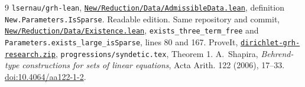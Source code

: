 \documentclass[11pt]{article}
\begin{document}
\begin{thebibliography}{9}
 \texttt{lsernau/grh-lean},
\href{https://github.com/lsernau/grh-lean/blob/72fead102f663d5c7a407964a13dc0cf9d977207/grh/src/New/Reduction/Data/AdmissibleData.lean}{\texttt{New/Reduction/Data/AdmissibleData.lean}},
definition \texttt{New.Parameters.IsSparse}. Readable edition.
 Same repository and commit,
\href{https://github.com/lsernau/grh-lean/blob/72fead102f663d5c7a407964a13dc0cf9d977207/grh/src/New/Reduction/Data/Existence.lean}{\texttt{New/Reduction/Data/Existence.lean}},
\texttt{exists\_three\_term\_free} and \texttt{Parameters.exists\_large\_isSparse},
lines 80 and 167.
 ProveIt, \href{https://github.com/VladimirReshetnikov/ProveIt/blob/d31039a48d963692e5a5176f47b6603fc9e9d9cf/docs/incoming/dirichlet-grh-research.zip}{\texttt{dirichlet-grh-research.zip}}, \texttt{progressions/syndetic.tex}, Theorem 1.
 A.~Shapira, \emph{Behrend-type constructions for sets of
linear equations}, Acta Arith. 122 (2006), 17--33.
\href{https://doi.org/10.4064/aa122-1-2}{doi:10.4064/aa122-1-2}.
\end{thebibliography}
\end{document}
